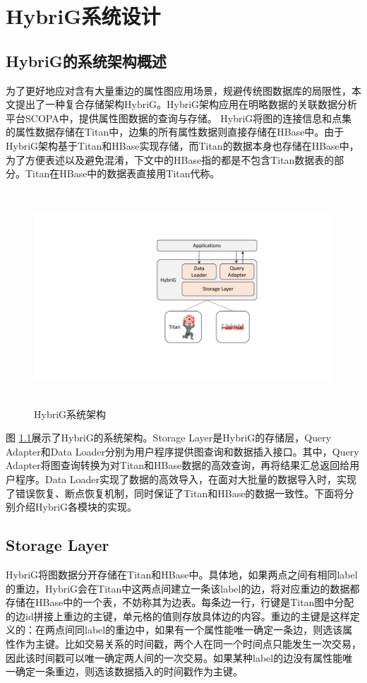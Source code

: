 
\chapter{HybriG系统设计} \label{chap:design}
\section{HybriG的系统架构概述}
为了更好地应对含有大量重边的属性图应用场景，规避传统图数据库的局限性，本文提出了一种复合存储架构HybriG。HybriG架构应用在明略数据的关联数据分析平台SCOPA中，提供属性图数据的查询与存储。
HybriG将图的连接信息和点集的属性数据存储在Titan中，边集的所有属性数据则直接存储在HBase中。由于HybriG架构基于Titan和HBase实现存储，而Titan的数据本身也存储在HBase中，为了方便表述以及避免混淆，下文中的HBase指的都是不包含Titan数据表的部分。Titan在HBase中的数据表直接用Titan代称。

\begin{figure}[htbp]
\centering
\includegraphics[height=80mm]{fig/arch.pdf}
\caption{HybriG系统架构}
\label{fig:arch}
\end{figure}

图 \ref{fig:arch}展示了HybriG的系统架构。Storage Layer是HybriG的存储层，Query Adapter和Data Loader分别为用户程序提供图查询和数据插入接口。其中，Query Adapter将图查询转换为对Titan和HBase数据的高效查询，再将结果汇总返回给用户程序。Data Loader实现了数据的高效导入，在面对大批量的数据导入时，实现了错误恢复、断点恢复机制，同时保证了Titan和HBase的数据一致性。下面将分别介绍HybriG各模块的实现。


\section{Storage Layer}
HybriG将图数据分开存储在Titan和HBase中。具体地，如果两点之间有相同label的重边，HybriG会在Titan中这两点间建立一条该label的边，将对应重边的数据都存储在HBase中的一个表，不妨称其为边表。每条边一行，行键是Titan图中分配的边id拼接上重边的主键，单元格的值则存放具体边的内容。重边的主键是这样定义的：在两点间同label的重边中，如果有一个属性能唯一确定一条边，则选该属性作为主键。比如交易关系的时间戳，两个人在同一个时间点只能发生一次交易，因此该时间戳可以唯一确定两人间的一次交易。如果某种label的边没有属性能唯一确定一条重边，则选该数据插入的时间戳作为主键。


